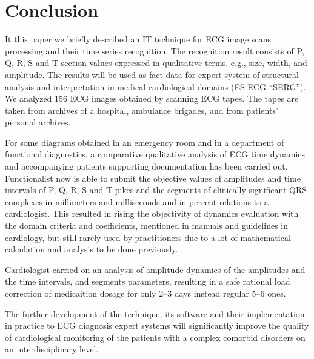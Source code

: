 \documentclass[runningheads]{AIIT}
\begin{document}
\section*{Conclusion}
It this paper we briefly described an IT technique for ECG image scans processing and their time series recognition.  The recognition result consists of P, Q, R, S and T section values expressed in qualitative terms, e.g., size, width, and amplitude.  The results will be used as fact data for expert system of structural analysis and interpretation in medical cardiological domains (ES ECG ``SERG'').  We analyzed 156 ECG images obtained by scanning ECG tapes.  The tapes are taken from archives of a hospital, ambulance brigades, and from patients' personal archives.

For some diagrams obtained in an emergency room and in a department of functional diagnostics, a comparative qualitative analysis of ECG time dynamics and accompanying patients supporting documentation has been carried out.  Functionalist now is able to submit the objective values of amplitudes and time intervals of P, Q, R, S and T pikes and the segments of clinically significant QRS complexes in millimeters and milliseconds and in percent relations to a cardiologist.  This resulted in rising the objectivity of dynamics evaluation with the domain criteria and coefficients, mentioned in manuals and guidelines in cardiology, but still rarely used by practitioners due to a lot of mathematical calculation and analysis to be done previously.

Cardiologist carried on an analysis of amplitude dynamics of the amplitudes and the time intervals, and segments parameters, resulting in a safe rational load correction of medicaition dosage for only 2--3 days instead regular 5--6 ones.

The further development of the technique, its software and their implementation in practice to ECG diagnosis expert systems will significantly improve the quality of cardiological monitoring of the patients with a complex comorbid disorders on an interdisciplinary level.
\end{document}
